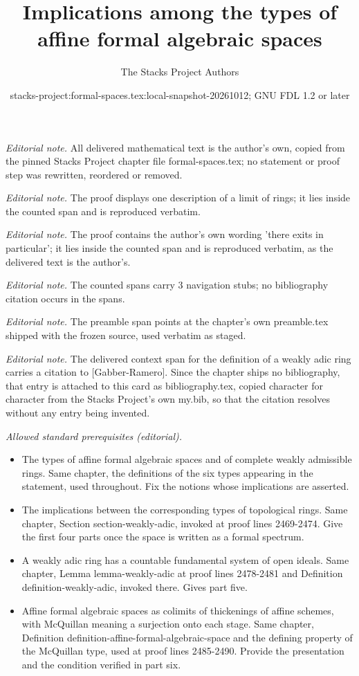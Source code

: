 \documentclass{stacks-project}
\title{Implications among the types of affine formal algebraic spaces}
\author{The Stacks Project Authors}
\date{stacks-project:formal-spaces.tex:local-snapshot-20261012; GNU FDL 1.2 or later}
\theoremstyle{plain}
\theoremstyle{definition}
\theoremstyle{remark}
\numberwithin{equation}{subsection}
\begin{document}
\maketitle
\noindent\textit{Editorial note.} All delivered mathematical text is the author's own, copied from the pinned Stacks Project chapter file formal-spaces.tex; no statement or proof step was rewritten, reordered or removed.\par\medskip
\noindent\textit{Editorial note.} The proof displays one description of a limit of rings; it lies inside the counted span and is reproduced verbatim.\par\medskip
\noindent\textit{Editorial note.} The proof contains the author's own wording 'there exits in particular'; it lies inside the counted span and is reproduced verbatim, as the delivered text is the author's.\par\medskip
\noindent\textit{Editorial note.} The counted spans carry 3 navigation stubs; no bibliography citation occurs in the spans.\par\medskip
\noindent\textit{Editorial note.} The preamble span points at the chapter's own preamble.tex shipped with the frozen source, used verbatim as staged.\par\medskip
\noindent\textit{Editorial note.} The delivered context span for the definition of a weakly adic ring carries a citation to [Gabber-Ramero]. Since the chapter ships no bibliography, that entry is attached to this card as bibliography.tex, copied character for character from the Stacks Project's own my.bib, so that the citation resolves without any entry being invented.\par\medskip
\noindent\textit{Allowed standard prerequisites (editorial).}\begin{itemize}
\item The types of affine formal algebraic spaces and of complete weakly admissible rings. Same chapter, the definitions of the six types appearing in the statement, used throughout. Fix the notions whose implications are asserted.
\item The implications between the corresponding types of topological rings. Same chapter, Section section-weakly-adic, invoked at proof lines 2469-2474. Give the first four parts once the space is written as a formal spectrum.
\item A weakly adic ring has a countable fundamental system of open ideals. Same chapter, Lemma lemma-weakly-adic at proof lines 2478-2481 and Definition definition-weakly-adic, invoked there. Gives part five.
\item Affine formal algebraic spaces as colimits of thickenings of affine schemes, with McQuillan meaning a surjection onto each stage. Same chapter, Definition definition-affine-formal-algebraic-space and the defining property of the McQuillan type, used at proof lines 2485-2490. Provide the presentation and the condition verified in part six.
\end{itemize}\medskip
\end{document}
